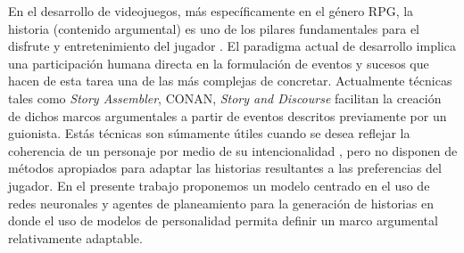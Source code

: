 \begin{resumen}


En el desarrollo de videojuegos, más específicamente en el género RPG, la historia (contenido argumental) es uno de los pilares fundamentales para el disfrute y entretenimiento del jugador \cite{schell2019art}. El paradigma actual de desarrollo implica una participación humana directa en la formulación de eventos y sucesos que hacen de esta tarea una de las más complejas de concretar. Actualmente técnicas tales como \textit{Story Assembler}, CONAN, \textit{Story and Discourse} facilitan la creación de dichos marcos argumentales a partir de eventos descritos previamente por un guionista. Estás técnicas son súmamente útiles cuando se desea reflejar la coherencia de un personaje por medio de su intencionalidad \cite{breault2018let}, pero no disponen de métodos apropiados para adaptar las historias resultantes a las preferencias del jugador. En el presente trabajo proponemos un modelo centrado en el uso de redes neuronales y agentes de planeamiento para la generación de historias en donde el uso de modelos de personalidad permita definir un marco argumental relativamente adaptable. 



\end{resumen}
